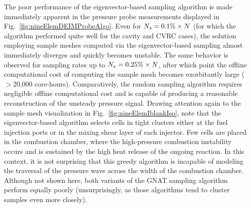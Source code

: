 The poor performance of the eigenvector-based sampling algorithm is made immediately apparent in the pressure probe measurements displayed in Fig.~\ref{fig:nineElemDEIMProbeAlgo}. Even for $N_s = 0.1\% \times N$ (for which the algorithm performed quite well for the cavity and CVRC cases), the solution employing sample meshes computed via the eigenvector-based sampling almost immediately diverges and quickly becomes unstable. The same behavior is observed for sampling rates up to $N_s = 0.25\% \times N$, after which point the offline computational cost of computing the sample mesh becomes exorbitantly large ($>$20,000 core-hours). Comparatively, the random sampling algorithm requires negligible offline computational cost and is capable of producing a reasonable reconstruction of the unsteady pressure signal. Drawing attention again to the sample mesh visualization in Fig.~\ref{fig:nineElemIblankIso}, note that the eigenvector-based algorithm selects cells in tight clusters either at the fuel injection ports or in the mixing shear layer of each injector. Few cells are placed in the combustion chamber, where the high-pressure combustion instability occurs and is sustained by the high heat release of the ongoing reaction. In this context, it is not surprising that this greedy algorithm is incapable of modeling the traversal of the pressure wave across the width of the combustion chamber. Although not shown here, both variants of the GNAT sampling algorithm perform equally poorly (unsurprisingly, as those algorithms tend to cluster samples even more closely).  

